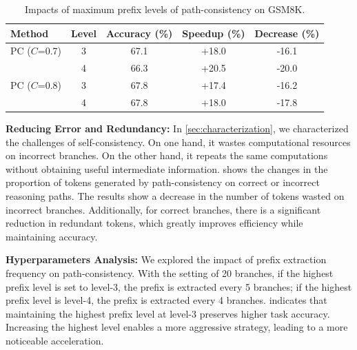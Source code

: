 \begin{table}
\vspace{-5mm}
  \caption{Impacts of maximum prefix levels of path-consistency on GSM8K.}
  \label{tab:level}
\vspace{-1mm}
\begin{scriptsize}
\setlength{\tabcolsep}{4pt}
    \begin{tabular}{@{}ccccc@{}}
    \toprule
    \multicolumn{1}{l}{Method} & \multicolumn{1}{l}{Level} & \multicolumn{1}{l}{Accuracy (\%)} & \multicolumn{1}{l}{Speedup (\%)} & \multicolumn{1}{l}{Decrease (\%)} \\ \midrule
    PC ($C$=0.7)                       & 3                              & 67.1                        & +18.0                              & -16.1                            \\
                                             & 4                              & 66.3                        & +20.5                              & -20.0                            \\ \midrule
    PC ($C$=0.8)                       & 3                              & 67.8                        & +17.4                              & -16.2                            \\
                                             & 4                              & 67.8                        & +18.0                              & -17.8                            \\ \bottomrule
    \end{tabular}

\end{scriptsize}
\end{table}%

\textbf{Reducing Error and Redundancy:}
In \cref{sec:characterization}, we characterized the challenges of self-consistency. On one hand, it wastes computational resources on incorrect branches. On the other hand, it repeats the same computations without obtaining useful intermediate information.  shows the changes in the proportion of tokens generated by path-consistency on correct or incorrect reasoning paths. The results show a decrease in the number of tokens wasted on incorrect branches. Additionally, for correct branches, there is a significant reduction in redundant tokens, which greatly improves efficiency while maintaining accuracy.

\textbf{Hyperparameters Analysis:}
We explored the impact of prefix extraction frequency on path-consistency. With the setting of 20 branches, if the highest prefix level is set to level-3, the prefix is extracted every 5 branches; if the highest prefix level is level-4, the prefix is extracted every 4 branches.  indicates that maintaining the highest prefix level at level-3 preserves higher task accuracy. Increasing the highest level enables a more aggressive strategy, leading to a more noticeable acceleration.

